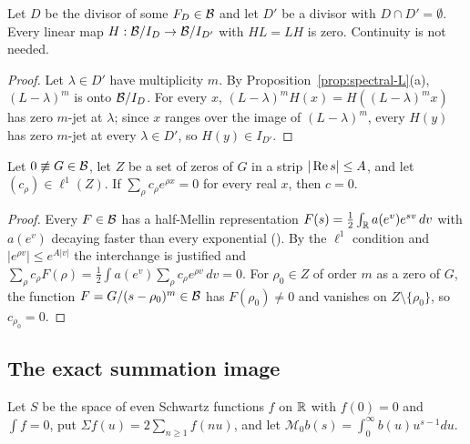 \begin{lemma}\label{lem:disjoint}
Let $D$ be the divisor of some $F_D\in\mathcal{B}$ and let $D'$ be a divisor with $D\cap D'=\emptyset$.
Every linear map $H:\mathcal{B}/I_D\to\mathcal{B}/I_{D'}$ with $HL=LH$ is zero. Continuity is not needed.
\end{lemma}

\begin{proof}
Let $\lambda\in D'$ have multiplicity $m$. By Proposition~\ref{prop:spectral-L}(a), $(L-\lambda)^m$ is onto $\mathcal{B}/I_D$. For every $x$, $(L-\lambda)^mH(x)=H((L-\lambda)^mx)$ has zero $m$-jet at $\lambda$; since $x$ ranges over the image of $(L-\lambda)^m$, every $H(y)$ has zero $m$-jet at every $\lambda\in D'$, so $H(y)\in I_{D'}$.
\end{proof}

\begin{lemma}\label{lem:expsum}
Let $0\not\equiv G\in\mathcal{B}$, let $Z$ be a set of zeros of $G$ in a strip $|\operatorname{Re} s|\le A$, and let $(c_\rho)\in\ell^1(Z)$.
If $\sum_\rho c_\rho e^{\rho x}=0$ for every real $x$, then $c=0$.
\end{lemma}

\begin{proof}
Every $F\in\mathcal{B}$ has a half-Mellin representation $F(s)=\tfrac12\int_{\mathbb{R}} a(e^v)e^{sv}\,dv$ with $a(e^v)$ decaying faster than every exponential (). By the $\ell^1$ condition and $|e^{\rho v}|\le e^{A|v|}$ the interchange is justified and $\sum_\rho c_\rho F(\rho)=\tfrac12\int a(e^v)\sum_\rho c_\rho e^{\rho v}\,dv=0$.
For $\rho_0\in Z$ of order $m$ as a zero of $G$, the function $F=G/(s-\rho_0)^m\in\mathcal{B}$ has $F(\rho_0)\ne0$ and vanishes on $Z\setminus\{\rho_0\}$, so $c_{\rho_0}=0$.
\end{proof}

\subsection{The exact summation image}

Let $S$ be the space of even Schwartz functions $f$ on $\mathbb{R}$ with $f(0)=0$ and $\int f=0$, put $\Sigma f(u)=2\sum_{n\ge1}f(nu)$, and let $\mathcal{M}_0b(s)=\int_0^\infty b(u)u^{s-1}du$.

